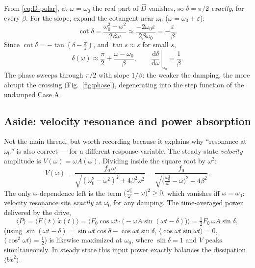\documentclass[11pt]{article}
\theoremstyle{plain}
\theoremstyle{definition}
\theoremstyle{remark}
\newcommand{\dd}{\mathrm{d}}
\begin{document}
From \eqref{eq:D-polar}, at $\omega=\omega_0$ the real part of $\hat D$ vanishes,
so $\delta = \pi/2$ \emph{exactly}, for every $\beta$. For the slope, expand
the cotangent near $\omega_0$ ($\omega = \omega_0 + \varepsilon$):
\begin{equation}
  \cot\delta = \frac{\omega_0^2-\omega^2}{2\beta\omega}
  \approx \frac{-2\omega_0\varepsilon}{2\beta\omega_0}
  = -\frac{\varepsilon}{\beta}.
\end{equation}
Since $\cot\delta = -\tan(\delta - \tfrac\pi2)$, and
$\tan s\approx s$ for small $s$,
\begin{equation}
  \delta(\omega) \approx \frac{\pi}{2} + \frac{\omega - \omega_0}{\beta},
  \qquad
  \left.\frac{\dd\delta}{\dd\omega}\right|_{\omega_0} = \frac{1}{\beta}.
\end{equation}
The phase sweeps through $\pi/2$ with slope $1/\beta$: the weaker the
damping, the more abrupt the crossing (Fig.~\ref{fig:phase}), degenerating
into the step function of the undamped Case A.

\subsection{Aside: velocity resonance and power absorption}
\label{sec:power}

Not the main thread, but worth recording because it explains why ``resonance
at $\omega_0$'' is also correct --- for a different response variable. The
steady-state \emph{velocity} amplitude is $V(\omega) = \omega A(\omega)$.
Dividing inside the square root by $\omega^2$:
\begin{equation}
  V(\omega) = \frac{f_0\,\omega}{\sqrt{(\omega_0^2-\omega^2)^2+4\beta^2\omega^2}}
  = \frac{f_0}{\sqrt{\bigl(\frac{\omega_0^2}{\omega} - \omega\bigr)^2 + 4\beta^2}} .
\end{equation}
The only $\omega$-dependence left is the term
$\bigl(\frac{\omega_0^2}{\omega}-\omega\bigr)^2 \ge 0$, which vanishes iff
$\omega = \omega_0$: velocity resonance sits \emph{exactly} at $\omega_0$
for any damping. The time-averaged power delivered by the drive,
\begin{equation}
  \langle P\rangle
  = \bigl\langle F(t)\,\dot x(t)\bigr\rangle
  = \bigl\langle F_0\cos\omega t\cdot\bigl(-\omega A \sin(\omega t - \delta)\bigr)\bigr\rangle
  = \tfrac12 F_0\,\omega A \sin\delta ,
\end{equation}
(using $\sin(\omega t-\delta) = \sin\omega t\cos\delta - \cos\omega
t\sin\delta$, $\langle\cos\omega t\sin\omega t\rangle = 0$,
$\langle\cos^2\omega t\rangle = \tfrac12$) is likewise maximized at
$\omega_0$, where $\sin\delta = 1$ and $V$ peaks simultaneously. In steady
state this input power exactly balances the dissipation
$\langle b\dot x^2\rangle$.
\end{document}
